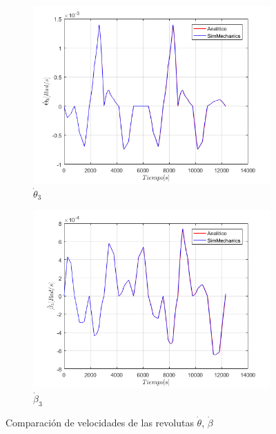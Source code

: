\begin{figure}
\begin{subfigure}{0.45\textwidth}
        \includegraphics[width=\linewidth]{Cap4_DisenoBasico/Figura/ComparativoSimMechanics/Thetapunto3.png}
        \caption{$\dot{\theta}_3$}
    \end{subfigure}
    \begin{subfigure}{0.45\textwidth}
        \includegraphics[width=\linewidth]{Cap4_DisenoBasico/Figura/ComparativoSimMechanics/betapunto3.png}
        \caption{$\dot{\beta}_3$}
    \end{subfigure}
    \caption{Comparación de velocidades de las revolutas $\dot{\theta}$, $\dot{\beta}$}
\end{figure}

